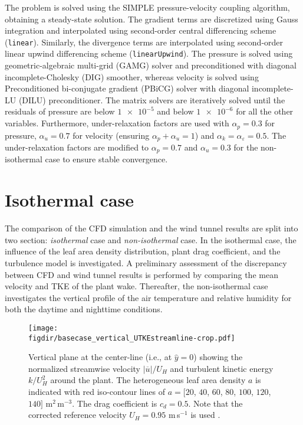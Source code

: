 The problem is solved using the SIMPLE pressure-velocity coupling algorithm, obtaining a steady-state solution. The gradient terms are discretized using Gauss integration and interpolated using second-order central differencing scheme (\texttt{linear}). Similarly, the divergence terms are interpolated using second-order linear upwind differencing scheme (\texttt{linearUpwind}). The pressure is solved using geometric-algebraic multi-grid (GAMG) solver and preconditioned with diagonal incomplete-Cholesky (DIG) smoother, whereas velocity is solved using Preconditioned bi-conjugate gradient (PBiCG) solver with diagonal incomplete-LU (DILU) preconditioner. The matrix solvers are iteratively solved until the residuals of pressure are below $\num{1e-5}$ and below $\num{1e-6}$ for all the other variables. Furthermore, under-relaxation factors are used with $\alpha_p = 0.3$ for pressure, $\alpha_u = 0.7$ for velocity (ensuring $\alpha_p + \alpha_u = 1$) and $\alpha_k = \alpha_{\varepsilon}=0.5$. The under-relaxation factors are modified to $\alpha_p=0.7$ and $\alpha_u=0.3$ for the non-isothermal case to ensure stable convergence.

\section{Isothermal case}

The comparison of the CFD simulation and the wind tunnel results are split into two section: \textit{isothermal} case and \textit{non-isothermal} case. In the isothermal case, the influence of the leaf area density distribution, plant drag coefficient, and the turbulence model is investigated. A preliminary assessment of the discrepancy between CFD and wind tunnel results is performed by comparing the mean velocity and TKE of the plant wake. Thereafter, the non-isothermal case investigates the vertical profile of the air temperature and relative humidity for both the daytime and nighttime conditions.

\begin{figure}[t]
	\centering
	\texttt{[image: \\figdir/basecase\_vertical\_UTKEstreamline-crop.pdf]}
	\caption{Vertical plane at the center-line (i.e., at $\hat{y}=0$) showing the normalized  streamwise velocity $|\overline{u}|/U_H$ and  turbulent kinetic energy $k/U_H^2$ around the plant. The heterogeneous leaf area density $a$ is indicated with red iso-contour lines of $a = [20$, $40$, $60$, $80$, $100$, $120$, $140]$ m$^2$\,m$^{-3}$. The drag coefficient is $c_d=0.5$. Note that the corrected reference velocity $U_H = 0.95$ m\,s$^{-1}$ is used \citep{Blocken2007b}.}
	\label{fig:basecase_vertical_UTKEstreamline}
\end{figure}

